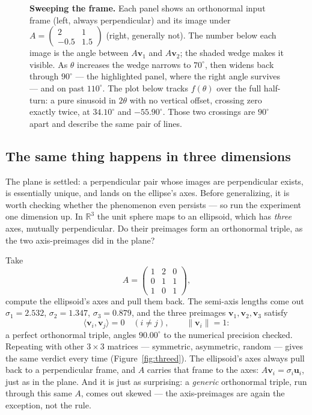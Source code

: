 \documentclass[11pt]{article}
\numberwithin{equation}{section}
\newcommand{\R}{\mathbb{R}}
\newcommand{\ip}[2]{\langle #1, #2 \rangle}
\newcommand{\vv}[1]{\mathbf{v}_{#1}}
\newcommand{\uu}[1]{\mathbf{u}_{#1}}
\theoremstyle{plainish}
\begin{document}
\begin{figure}[htbp]
\centering

\vspace{1.2em}


\caption{\textbf{Sweeping the frame.} Each panel shows an orthonormal input
frame (left, always perpendicular) and its image under
$A = \left(\begin{smallmatrix}2 & 1\\ -0.5 & 1.5\end{smallmatrix}\right)$
(right, generally not). The number below each image is the angle between
$A\vv1$ and $A\vv2$; the shaded wedge makes it visible. As $\theta$ increases
the wedge narrows to $70^\circ$, then widens back through $90^\circ$ --- the
highlighted panel, where the right angle survives --- and on past
$110^\circ$. The plot below tracks $f(\theta)$ over the full half-turn: a pure
sinusoid in $2\theta$ with no vertical offset, crossing zero exactly twice, at
$34.10^\circ$ and $-55.90^\circ$. Those two crossings are $90^\circ$ apart and
describe the same pair of lines.}
\label{fig:sweep}
\end{figure}

\subsection{The same thing happens in three dimensions}
\label{sec:threed}

The plane is settled: a perpendicular pair whose images are perpendicular exists,
is essentially unique, and lands on the ellipse's axes. Before generalizing,
it is worth checking whether the phenomenon even persists --- so run the
experiment one dimension up. In $\R^3$ the unit sphere maps to an ellipsoid,
which has \emph{three} axes, mutually perpendicular. Do their preimages form an
orthonormal triple, as the two axis-preimages did in the plane?

Take
\begin{equation}A = \begin{pmatrix} 1 & 2 & 0 \\ 0 & 1 & 1 \\ 1 & 0 & 1 \end{pmatrix},
\end{equation}
compute the ellipsoid's axes and pull them back. The semi-axis lengths come out
$\sigma_1 = 2.532$, $\sigma_2 = 1.347$, $\sigma_3 = 0.879$, and the three
preimages $\vv1, \vv2, \vv3$ satisfy
\begin{equation}\ip{\vv i}{\vv j} = 0 \quad (i \neq j), \qquad \|\vv i\| = 1 :
\end{equation}
a perfect orthonormal triple, angles $90.00^\circ$ to the numerical precision
checked. Repeating with other $3\times 3$ matrices --- symmetric, asymmetric,
random --- gives the same verdict every time (Figure~\ref{fig:threed}). The
ellipsoid's axes always pull back to a perpendicular frame, and $A$ carries that
frame to the axes: $A\vv i = \sigma_i \uu i$, just as in the plane. And it is
just as surprising: a \emph{generic} orthonormal triple, run through this same
$A$, comes out skewed --- the axis-preimages are again the exception, not the
rule.
\end{document}
